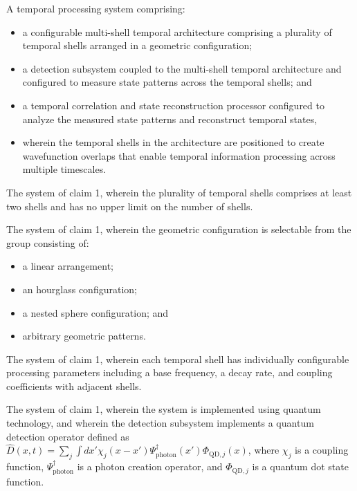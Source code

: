 \documentclass[12pt,letterpaper]{article}
\begin{document}
\begin{patentclaims}
    \item A temporal processing system comprising:
    \begin{itemize}[leftmargin=2em]
        \item a configurable multi-shell temporal architecture comprising a plurality of temporal shells arranged in a geometric configuration;
        \item a detection subsystem coupled to the multi-shell temporal architecture and configured to measure state patterns across the temporal shells; and
        \item a temporal correlation and state reconstruction processor configured to analyze the measured state patterns and reconstruct temporal states,
        \item wherein the temporal shells in the architecture are positioned to create wavefunction overlaps that enable temporal information processing across multiple timescales.
    \end{itemize}
    
    \item The system of claim 1, wherein the plurality of temporal shells comprises at least two shells and has no upper limit on the number of shells.
    
    \item The system of claim 1, wherein the geometric configuration is selectable from the group consisting of:
    \begin{itemize}[leftmargin=2em]
        \item a linear arrangement;
        \item an hourglass configuration;
        \item a nested sphere configuration; and
        \item arbitrary geometric patterns.
    \end{itemize}
    
    \item The system of claim 1, wherein each temporal shell has individually configurable processing parameters including a base frequency, a decay rate, and coupling coefficients with adjacent shells.
    
    \item The system of claim 1, wherein the system is implemented using quantum technology, and wherein the detection subsystem implements a quantum detection operator defined as $\hat{D}(x,t) = \sum_j \int dx' \chi_j(x-x')\Psi_{\text{photon}}^\dagger(x')\Phi_{\text{QD},j}(x)$, where $\chi_j$ is a coupling function, $\Psi_{\text{photon}}^\dagger$ is a photon creation operator, and $\Phi_{\text{QD},j}$ is a quantum dot state function.
    

\end{patentclaims}
\end{document}
